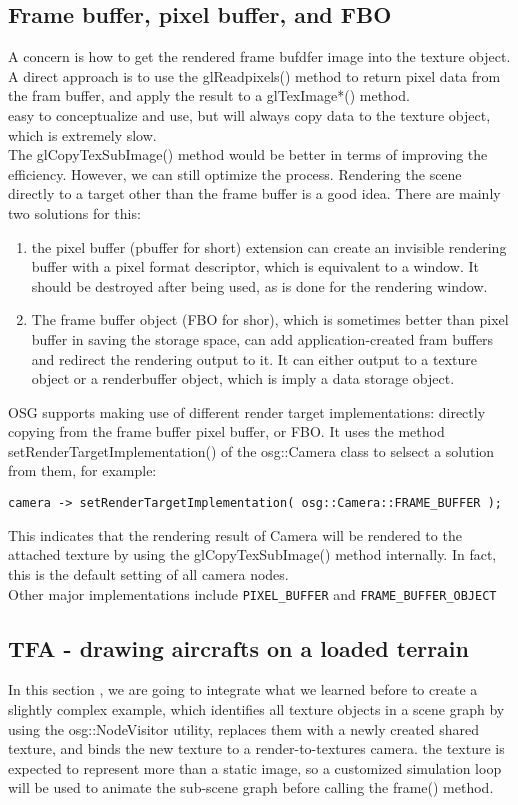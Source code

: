 \documentclass[a4paper,12pt]{book}
\begin{document}
\subsection{Frame buffer, pixel buffer, and FBO}
A concern is how to get the rendered frame bufdfer image into the texture object. A direct approach is to use the glReadpixels() method to return pixel data from the fram buffer, and apply the result to a glTexImage*() method.\\
\textrightarrow easy to conceptualize and use, but will always copy data to the texture object, which is extremely slow.\\

The glCopyTexSubImage() method would be better in terms of improving the efficiency. However, we can still optimize the process. Rendering the scene directly to a target other than the frame buffer is a good idea. There are mainly two solutions for this:
\begin{enumerate}
\item the pixel buffer (pbuffer for short) extension can create an invisible rendering buffer with a pixel format descriptor, which is equivalent to a window. It should be destroyed after being used, as is done for the rendering window.
\item The frame buffer object (FBO for shor), which is sometimes better than pixel buffer in saving the storage space, can add application-created fram buffers and redirect the rendering output to it. It can either output to a texture object or a renderbuffer object, which is imply a data storage object.
\end{enumerate}

OSG supports making use of different render target implementations: directly copying from the frame buffer pixel buffer, or FBO. It uses the method setRenderTargetImplementation() of the osg::Camera class to selsect a solution from them, for example:

\begin{lstlisting}
camera -> setRenderTargetImplementation( osg::Camera::FRAME_BUFFER );
\end{lstlisting}

This indicates that the rendering result of Camera will be rendered to the attached texture by using the glCopyTexSubImage() method internally. In fact, this is the default setting of all camera nodes.\\
Other major implementations include \verb|PIXEL_BUFFER| and \verb|FRAME_BUFFER_OBJECT|

\subsection{TFA - drawing aircrafts on a loaded terrain}
In this section , we are going to integrate what we learned before to create a slightly complex example, which identifies all texture objects in a scene graph by using the osg::NodeVisitor utility, replaces them with a newly created shared texture, and binds the new texture to a render-to-textures camera. the texture is expected to represent more than a static image, so a customized simulation loop will be used to animate the sub-scene graph before calling the frame() method.
\end{document}
